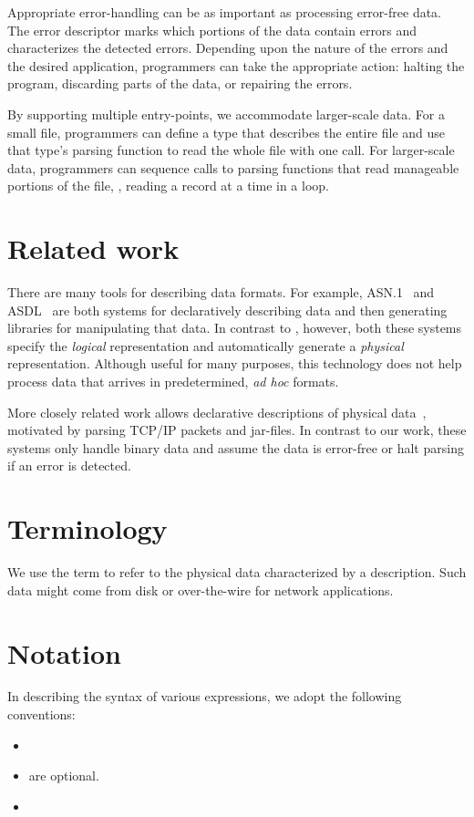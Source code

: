 Appropriate error-handling can be as important as processing
error-free data.  The error descriptor marks which portions of the
data contain errors and characterizes the detected errors.
Depending upon the nature of the errors and the desired application,
programmers can take the appropriate action: halting the program,
discarding parts of the data, or repairing the errors.

By supporting multiple entry-points, we accommodate larger-scale data.
For a small file, programmers can define a \padsl{} type that describes
the entire file and use that type's parsing function to read the whole
file with one call.  For larger-scale data, programmers can sequence
calls to parsing functions that read manageable portions of the file,
\eg{}, reading a record at a time in a loop.

\section{Related work}
There are many tools for describing data formats. For example,
\textsc{ASN.1}~\cite{asn} and \textsc{ASDL}~\cite{asdl} are both
systems for declaratively describing data and then generating
libraries for manipulating that data.  In contrast to \pads{},
however, both these systems specify the {\em logical\/} representation
and automatically generate a {\em physical\/} representation.
Although useful for many purposes, this technology does not help
process data that arrives in predetermined, \textit{ad hoc} formats.


More closely related work allows declarative descriptions of physical
data~\cite{sigcomm00,erlang-bit-syntax,gpce02}, motivated by parsing
\textsc{TCP/IP} packets and \java{} jar-files.  In contrast to our
work, these systems only handle binary data and assume the data is
error-free or halt parsing if an error is detected.  

\section{Terminology}
We use the term \textit{\external{}} to refer to the physical
data characterized by a \pads{} description.  Such data might 
come from disk or over-the-wire for network applications.

\section{Notation}
In describing the syntax of various \padsl{} expressions, we
adopt the following conventions:
\begin{itemize}
\item {}
\item {} are optional.
\item {}
\end{itemize}

